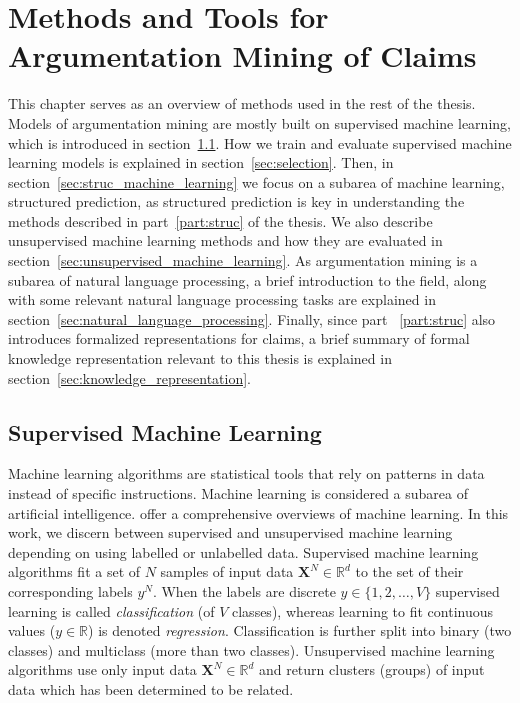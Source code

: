 \chapter{Methods and Tools for Argumentation Mining of Claims}

This chapter serves as an overview of methods used in the rest of the thesis.
Models of argumentation mining are mostly built on supervised machine learning,
which is introduced in section~\ref{sec:unstruc_machine_learning}.  How we
train and evaluate supervised machine learning models is explained in
section~\ref{sec:selection}.  Then, in section~\ref{sec:struc_machine_learning}
we focus on a subarea of machine learning, structured prediction, as structured
prediction is key in understanding the methods described in
part~\ref{part:struc} of the thesis. We also describe unsupervised machine
learning methods and how they are evaluated in
section~\ref{sec:unsupervised_machine_learning}.  As argumentation mining is a
subarea of natural language processing, a brief introduction to the field,
along with some relevant natural language processing tasks are explained in
section~\ref{sec:natural_language_processing}.  Finally, since part
~\ref{part:struc} also introduces formalized representations for claims, a
brief summary of formal knowledge representation relevant to this thesis is
explained in section~\ref{sec:knowledge_representation}. 

\section{Supervised Machine Learning}
\label{sec:unstruc_machine_learning}

Machine learning algorithms are statistical tools that rely on patterns in data
instead of specific instructions. Machine learning is considered a subarea of
artificial intelligence. \citep{russell2016artificial, bishop2006pattern} offer
a comprehensive overviews of machine learning.  In this work, we discern between
supervised and unsupervised machine learning depending on using labelled or
unlabelled data.  
Supervised machine learning algorithms fit a set of $N$
samples of input data $\textbf{X}^N \in \mathbb{R}^d$ to the set of their
corresponding labels $y^N $. When the labels are discrete $y \in \{1, 2, \dots ,
V\}$ supervised learning is called \emph{classification} (of $V$ classes), whereas
learning to fit continuous values ($y \in \mathbb{R}$) is denoted \emph{regression}. 
Classification is further split into binary (two classes) and multiclass (more
than two classes).  Unsupervised machine learning algorithms use only input
data $\textbf{X}^N \in \mathbb{R}^d$ and return clusters (groups) of input data
which has been determined to be related. 

